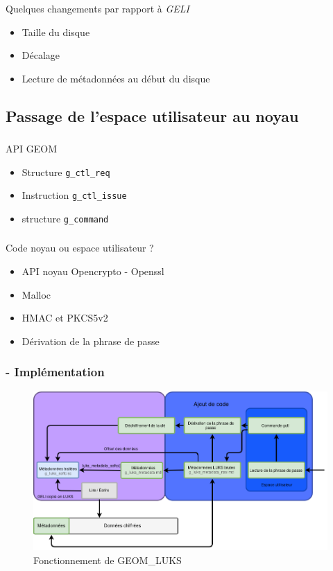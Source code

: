 \begin{frame}
	\frametitle{\insertsubsectionhead}
	\begin{block}{Quelques changements par rapport à \textit{GELI}}
		\begin{itemize}
			\item Taille du disque
				\pause
			\item Décalage
				\pause
			\item Lecture de métadonnées au début du disque
		\end{itemize}
	\end{block}
\end{frame}

\subsection{Passage de l'espace utilisateur au noyau}

\begin{frame}
	\frametitle{\insertsubsectionhead}
	\begin{block}{API GEOM}
		\begin{itemize}
			\item Structure \texttt{g\_ctl\_req}
			\item Instruction \texttt{g\_ctl\_issue}
			\item structure \texttt{g\_command}
		\end{itemize}
	\end{block}
\end{frame}

\begin{frame}
	\frametitle{\insertsubsectionhead}
	\begin{block}{Code noyau ou espace utilisateur ?}
		\begin{itemize}
			\item API noyau Opencrypto - Openssl
			\item Malloc
			\item HMAC et PKCS5v2
			\item Dérivation de la phrase de passe
		\end{itemize}
	\end{block}
\end{frame}

\begin{frame}
	\frametitle{\insertsubsectionhead - Implémentation}
	\begin{figure}
		\includegraphics[width=\textwidth]{developpement/utilisation_metadonnee_luks_2}
		\caption{Fonctionnement de GEOM\_LUKS}
	\end{figure}
\end{frame}
